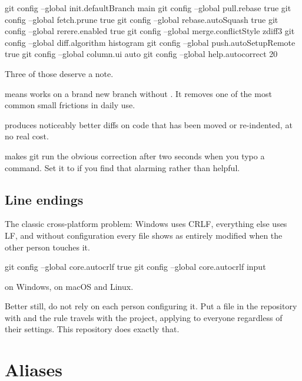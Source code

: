 \documentclass[11pt]{article}
\begin{document}
\begin{shell}
git config --global init.defaultBranch main
git config --global pull.rebase true
git config --global fetch.prune true
git config --global rebase.autoSquash true
git config --global rerere.enabled true
git config --global merge.conflictStyle zdiff3
git config --global diff.algorithm histogram
git config --global push.autoSetupRemote true
git config --global column.ui auto
git config --global help.autocorrect 20
\end{shell}

Three of those deserve a note.

 means  works on a brand new branch without
. It removes one of the most common small frictions in daily
use.

 produces noticeably better diffs on code that has been
moved or re-indented, at no real cost.

 makes git run the obvious correction after two seconds when
you typo a command. Set it to  if you find that alarming rather than helpful.

\subsection{Line endings}

The classic cross-platform problem: Windows uses CRLF, everything else uses LF, and
without configuration every file shows as entirely modified when the other person
touches it.

\begin{shell}
git config --global core.autocrlf true
git config --global core.autocrlf input
\end{shell}

 on Windows,  on macOS and Linux.

\begin{note}
Better still, do not rely on each person configuring it. Put a 
file in the repository with  and the rule travels with the
project, applying to everyone regardless of their settings. This repository does
exactly that.
\end{note}

\section{Aliases}
\end{document}
